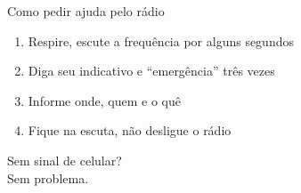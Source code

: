 \begin{frame}{Como pedir ajuda pelo rádio}
  \begin{enumerate}
    \item Respire, escute a frequência por alguns segundos
    \item Diga seu indicativo e “\alert{emergência}” três vezes
    \item Informe \alert{onde}, \alert{quem} e \alert{o quê}
    \item Fique na escuta, não desligue o rádio
  \end{enumerate}
\end{frame}

\begin{frame}[standout]
  Sem sinal de celular? \\ Sem problema.
\end{frame}

